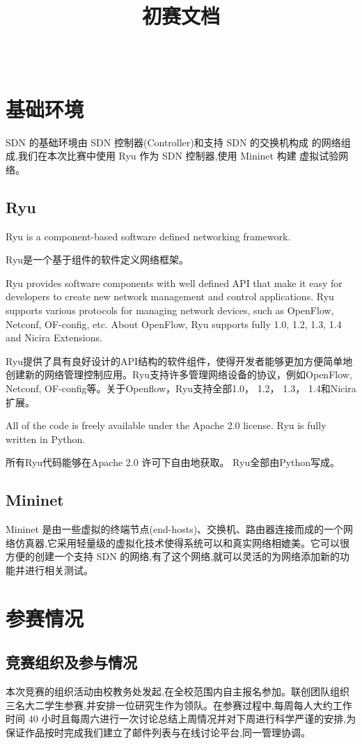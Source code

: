 \documentclass[format=draft,language=chinese,category=SDN]{hustreport}
\title{初赛文档}
\author{\kai{林家军}~~\kai{李英儒}~~\kai{胡云锐}}
\begin{document}
\frontmatter
\maketitle
\makeabstract
\tableofcontents
\listoffigures
\listoftables
\mainmatter

\chapter{基础环境}\label{chapter:BaiscEnv}
SDN 的基础环境由 SDN 控制器(Controller)和支持 SDN 的交换机构成
的网络组成,我们在本次比赛中使用 Ryu 作为 SDN 控制器,使用 Mininet 构建
虚拟试验网络。
\section{Ryu}
Ryu is a component-based software defined networking framework.

Ryu是一个基于组件的软件定义网络框架。

Ryu provides software components with well defined API that make it easy for developers to create new network management and control applications. Ryu supports various protocols for managing network devices, such as OpenFlow, Netconf, OF-config, etc. About OpenFlow, Ryu supports fully 1.0, 1.2, 1.3, 1.4 and Nicira Extensions.

Ryu提供了具有良好设计的API结构的软件组件，使得开发者能够更加方便简单地创建新的网络管理控制应用。Ryu支持许多管理网络设备的协议，例如OpenFlow, Netconf, OF-config等。关于Openflow，Ryu支持全部1.0， 1.2， 1.3， 1.4和Nicira扩展。

All of the code is freely available under the Apache 2.0 license. Ryu is fully written in Python.

所有Ryu代码能够在Apache 2.0 许可下自由地获取。 Ryu全部由Python写成。

\section{Mininet}
Mininet 是由一些虚拟的终端节点(end-hosts)、交换机、路由器连接而成的一个网络仿真器,它采用轻量级的虚拟化技术使得系统可以和真实网络相媲美。它可以很方便的创建一个支持 SDN 的网络,有了这个网络,就可以灵活的为网络添加新的功能并进行相关测试。

\chapter{参赛情况}\label{chapter:Situation}


\section{竞赛组织及参与情况}
本次竞赛的组织活动由校教务处发起,在全校范围内自主报名参加。联创团队组织三名大二学生参赛,并安排一位研究生作为领队。在参赛过程中,每周每人大约工作时间 40 小时且每周六进行一次讨论总结上周情况并对下周进行科学严谨的安排,为保证作品按时完成我们建立了邮件列表与在线讨论平台,同一管理协调。
\end{document}
